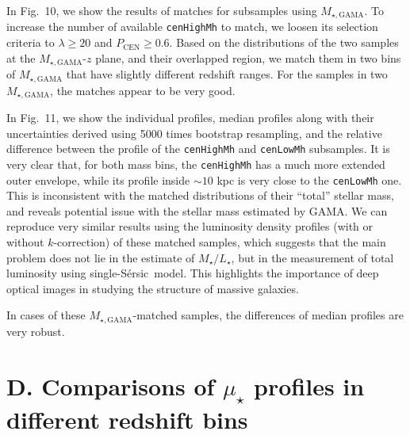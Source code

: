 \documentclass{emulateapj}
\def\ser{{S\'{e}rsic\ }}
\def\rbcg{\texttt{cenHighMh}}
\def\nbcg{\texttt{cenLowMh}}
\def\m2l{{$M_{\star}/L_{\star}$}}
\def\mden{{$\mu_{\star}$}}
\begin{document}
\begin{CJK*}{UTF8}{gbsn}
    
    In Fig.~10, we show the results of matches for subsamples using 
    $M_{\star, \mathrm{GAMA}}$.  
    To increase the number of available \rbcg{} to match, we loosen 
    its selection criteria to $\lambda \ge 20$ and $P_{\mathrm{CEN}} \ge 0.6$.
    Based on the distributions of the two samples at the $M_{\star, \mathrm{GAMA}}$-$z$ 
    plane, and their overlapped region, we match them in two bins of 
    $M_{\star, \mathrm{GAMA}}$ that have slightly different redshift ranges. 
    For the samples in two $M_{\star, \mathrm{GAMA}}$, the matches appear to be
    very good.  
    
    In Fig.~11, we show the individual profiles, median profiles along with their 
    uncertainties derived using 5000 times bootstrap resampling, and the relative 
    difference between the profile of the \rbcg{} and \nbcg{} 
    subsamples.  
    It is very clear that, for both mass bins, the \rbcg{} has a much 
    more extended outer envelope, while its profile inside $\sim 10$ kpc is 
    very close to the \nbcg{} one.  
    This is inconsistent with the matched distributions of their ``total'' 
    stellar mass, and reveals potential issue with the stellar mass estimated 
    by GAMA.
    We can reproduce very similar results using the luminosity density profiles 
    (with or without $k$-correction) of these matched samples, which suggests 
    that the main problem does not lie in the estimate of \m2l{}, but in the 
    measurement of total luminosity using single-\ser model.  
    This highlights the importance of deep optical images in studying the 
    structure of massive galaxies. 
    
        In cases of these $M_{\star, \mathrm{GAMA}}$-matched samples, the differences
    of median profiles are very robust. 


\section{D. Comparisons of \mden{} profiles in different redshift bins}
    \label{app:D}


\end{CJK*}
\end{document}
